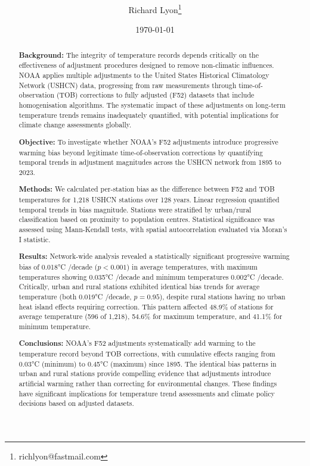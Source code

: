\documentclass[11pt, a4paper]{article}
\title{\bfseries \thetitle} %
\author{Richard Lyon\thanks{richlyon@fastmail.com}}
\date{\today}
\begin{document}
\maketitle
\thispagestyle{empty} %
\begin{abstract}

\noindent\textbf{Background:} The integrity of temperature records depends critically on the effectiveness of adjustment procedures designed to remove non-climatic influences. NOAA applies multiple adjustments to the United States Historical Climatology Network (USHCN) data, progressing from raw measurements through time-of-observation (TOB) corrections to fully adjusted (F52) datasets that include homogenisation algorithms. The systematic impact of these adjustments on long-term temperature trends remains inadequately quantified, with potential implications for climate change assessments globally.

\vspace{0.5em}
\noindent\textbf{Objective:} To investigate whether NOAA's F52 adjustments introduce progressive warming bias beyond legitimate time-of-observation corrections by quantifying temporal trends in adjustment magnitudes across the USHCN network from 1895 to 2023.

\vspace{0.5em}
\noindent\textbf{Methods:} We calculated per-station bias as the difference between F52 and TOB temperatures for 1,218 USHCN stations over 128 years. Linear regression quantified temporal trends in bias magnitude. Stations were stratified by urban/rural classification based on proximity to population centres. Statistical significance was assessed using Mann-Kendall tests, with spatial autocorrelation evaluated via Moran's I statistic.

\vspace{0.5em}
\noindent\textbf{Results:} Network-wide analysis revealed a statistically significant progressive warming bias of 0.018°C /decade ($p < 0.001$) in average temperatures, with maximum temperatures showing 0.035°C /decade and minimum temperatures 0.002°C /decade. Critically, urban and rural stations exhibited identical bias trends for average temperature (both 0.019°C /decade, $p = 0.95$), despite rural stations having no urban heat island effects requiring correction. This pattern affected 48.9\% of stations for average temperature (596 of 1,218), 54.6\% for maximum temperature, and 41.1\% for minimum temperature.

\vspace{0.5em}
\noindent\textbf{Conclusions:} NOAA's F52 adjustments systematically add warming to the temperature record beyond TOB corrections, with cumulative effects ranging from 0.03°C (minimum) to 0.45°C (maximum) since 1895. The identical bias patterns in urban and rural stations provide compelling evidence that adjustments introduce artificial warming rather than correcting for environmental changes. These findings have significant implications for temperature trend assessments and climate policy decisions based on adjusted datasets.


\end{abstract}
\end{document}
